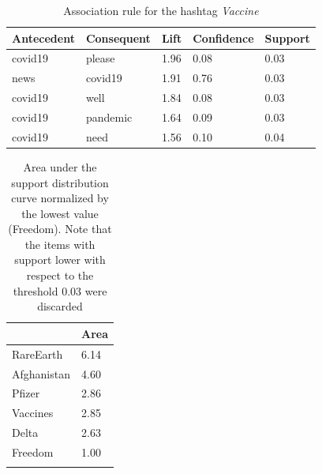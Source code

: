 \documentclass[12pt,%
               a4paper,%
               oneside,openany,%
               titlepage,%
               headinclude,footinclude,%
               BCOR5mm,%
               cleardoublepage=empty,%
               tablecaptionabove,%
               floatperchapter,
               ]{scrreprt}                 %
\begin{document}
\begin{table}[]
\caption{Association rule for the hashtag \textit{Vaccine}}
\begin{tabular}{l|l|l|l|l}
\textbf{Antecedent} & \textbf{Consequent}  & \textbf{Lift} & \textbf{Confidence} & \textbf{Support }\\ \hline
covid19    & please     & 1.96 & 0.08       & 0.03    \\ \hline
news       & covid19    & 1.91 & 0.76       & 0.03    \\ \hline
covid19    & well       & 1.84 & 0.08       & 0.03    \\ \hline
covid19    & pandemic   & 1.64 & 0.09       & 0.03    \\ \hline
covid19    & need       & 1.56 & 0.10       & 0.04
\label{ASS_Vaccine}
\end{tabular}
\end{table}





\begin{table}[]
\begin{center}
\caption{Area under the support distribution curve normalized by the lowest value (Freedom). Note that the items with support lower with respect to the threshold 0.03 were discarded}
\begin{tabular}{l|l}
            & Area  \\ \hline
RareEarth   & 6.14 \\ \hline
Afghanistan & 4.60  \\ \hline
Pfizer      & 2.86  \\ \hline
Vaccines    & 2.85  \\ \hline
Delta       & 2.63  \\ \hline
Freedom     & 1.00     \\
\label{TAB_area}
\end{tabular}
\end{center}
\end{table}
\end{document}
